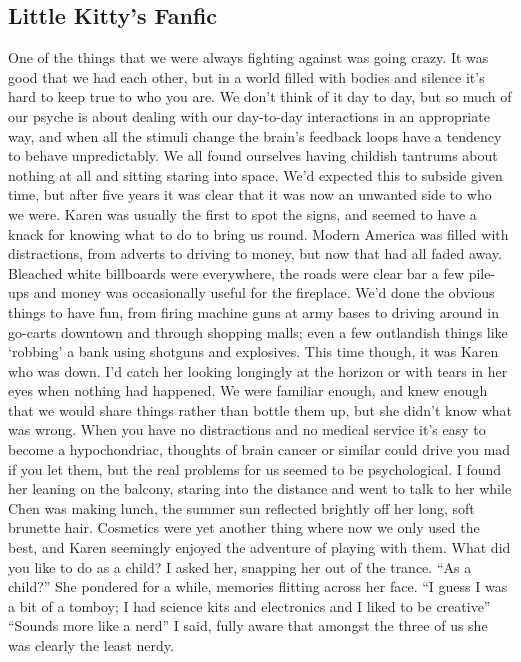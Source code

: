 \documentclass[a4paper]{article}
\begin{document}
\subsection{Little Kitty's Fanfic}
One of the things that we were always fighting against was going crazy. It was good that we had each other, but in a world filled with bodies and silence it’s hard to keep true to who you are. We don’t think of it day to day, but so much of our psyche is about dealing with our day-to-day interactions in an appropriate way, and when all the stimuli change the brain’s feedback loops have a tendency to behave unpredictably. We all found ourselves having childish tantrums about nothing at all and sitting staring into space. We’d expected this to subside given time, but after five years it was clear that it was now an unwanted side to who we were.
Karen was usually the first to spot the signs, and seemed to have a knack for knowing what to do to bring us round. Modern America was filled with distractions, from adverts to driving to money, but now that had all faded away. Bleached white billboards were everywhere, the roads were clear bar a few pile-ups and money was occasionally useful for the fireplace. We’d done the obvious things to have fun, from firing machine guns at army bases to driving around in go-carts downtown and through shopping malls; even a few outlandish things like ‘robbing’ a bank using shotguns and explosives.
This time though, it was Karen who was down. I’d catch her looking longingly at the horizon or with tears in her eyes when nothing had happened. We were familiar enough, and knew enough that we would share things rather than bottle them up, but she didn’t know what was wrong. When you have no distractions and no medical service it’s easy to become a hypochondriac, thoughts of brain cancer or similar could drive you mad if you let them, but the real problems for us seemed to be psychological. I found her leaning on the balcony, staring into the distance and went to talk to her while Chen was making lunch, the summer sun reflected brightly off her long, soft brunette hair. Cosmetics were yet another thing where now we only used the best, and Karen seemingly enjoyed the adventure of playing with them.
What did you like to do as a child? I asked her, snapping her out of the trance.
“As a child?” She pondered for a while, memories flitting across her face. “I guess I was a bit of a tomboy; I had science kits and electronics and I liked to be creative”
“Sounds more like a nerd” I said, fully aware that amongst the three of us she was clearly the least nerdy.
\end{document}

